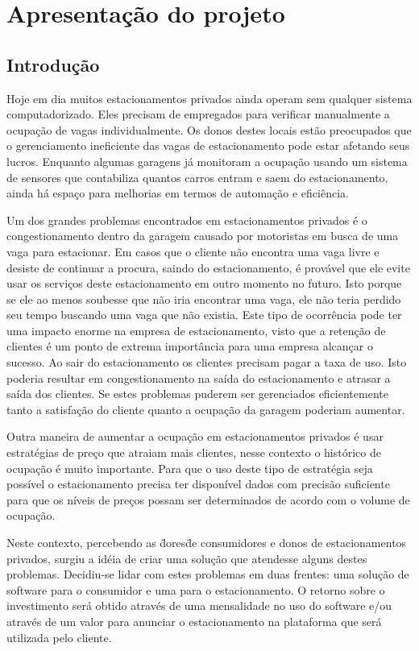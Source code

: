 \part{Apresentação do projeto}

\chapter[Introdução]{Introdução}

Hoje em dia muitos estacionamentos privados ainda operam sem qualquer sistema computadorizado. Eles precisam de empregados para verificar manualmente a ocupação de vagas individualmente. Os donos destes locais estão preocupados que o gerenciamento ineficiente das vagas de estacionamento pode estar afetando seus lucros. Enquanto algumas garagens já monitoram a ocupação usando um sistema de sensores que contabiliza quantos carros entram e saem do estacionamento, ainda há espaço para melhorias em termos de automação e eficiência.

Um dos grandes problemas encontrados em estacionamentos privados é o congestionamento dentro da garagem causado por motoristas em busca de uma vaga para estacionar. Em casos que o cliente não encontra uma vaga livre e desiste de continuar a procura, saindo do estacionamento, é provável que ele evite usar os serviços deste estacionamento em outro momento no futuro. Isto porque se ele ao menos soubesse que não iria encontrar uma vaga, ele não teria perdido seu tempo buscando uma vaga que não existia. Este tipo de ocorrência pode ter uma impacto enorme na empresa de estacionamento, visto que a retenção de clientes é um ponto de extrema importância para uma empresa alcançar o sucesso. Ao sair do estacionamento os clientes precisam pagar a taxa de uso. Isto poderia resultar em congestionamento na saída do estacionamento e atrasar a saída dos clientes. Se estes problemas puderem ser gerenciados eficientemente tanto a satisfação do cliente quanto a ocupação da garagem poderiam aumentar.

Outra maneira de aumentar a ocupação em estacionamentos privados é usar estratégias de preço que atraiam mais clientes, nesse contexto o histórico de ocupação é muito importante. Para que o uso deste tipo de estratégia seja possível o estacionamento precisa ter disponível dados com precisão suficiente para que os níveis de preços possam ser determinados de acordo com o volume de ocupação.

Neste contexto, percebendo as \"dores\" de consumidores e donos de estacionamentos privados, surgiu a idéia de criar uma solução que atendesse alguns destes problemas. Decidiu-se lidar com estes problemas em duas frentes: uma solução de software para o consumidor e uma para o estacionamento. O retorno sobre o investimento será obtido através de uma mensalidade no uso do software e/ou através de um valor para anunciar o estacionamento na plataforma que será utilizada pelo cliente.

